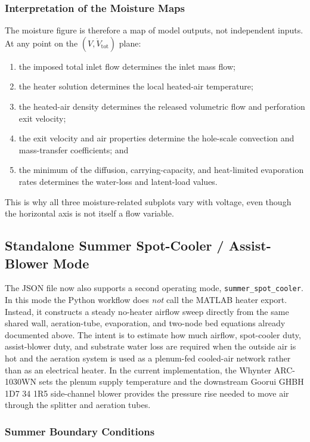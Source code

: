 \documentclass{article}
\begin{document}
\subsubsection{Interpretation of the Moisture Maps}

The moisture figure is therefore a map of model outputs, not independent
inputs. At any point on the $(V,\dot{V}_{\mathrm{tot}})$ plane:
\begin{enumerate}
\item the imposed total inlet flow determines the inlet mass flow;
\item the heater solution determines the local heated-air temperature;
\item the heated-air density determines the released volumetric flow and
      perforation exit velocity;
\item the exit velocity and air properties determine the hole-scale
      convection and mass-transfer coefficients; and
\item the minimum of the diffusion, carrying-capacity, and heat-limited
      evaporation rates determines the water-loss and latent-load values.
\end{enumerate}
This is why all three moisture-related subplots vary with voltage, even
though the horizontal axis is not itself a flow variable.

\subsection{Standalone Summer Spot-Cooler / Assist-Blower Mode}

The JSON file now also supports a second operating mode,
\texttt{summer\_spot\_cooler}. In this mode the Python workflow does
\emph{not} call the MATLAB heater export. Instead, it constructs a
steady no-heater airflow sweep directly from the same shared wall,
aeration-tube, evaporation, and two-node bed equations already documented
above. The intent is to estimate how much airflow, spot-cooler duty, assist-blower duty, and
substrate water loss are required when the outside air is hot and the
aeration system is used as a plenum-fed cooled-air network rather than as an
electrical heater. In the current implementation, the Whynter ARC-1030WN
sets the plenum supply temperature and the downstream Goorui
GHBH 1D7 34 1R5 side-channel blower provides the pressure rise needed to move
air through the splitter and aeration tubes.

\subsubsection{Summer Boundary Conditions}
\end{document}
